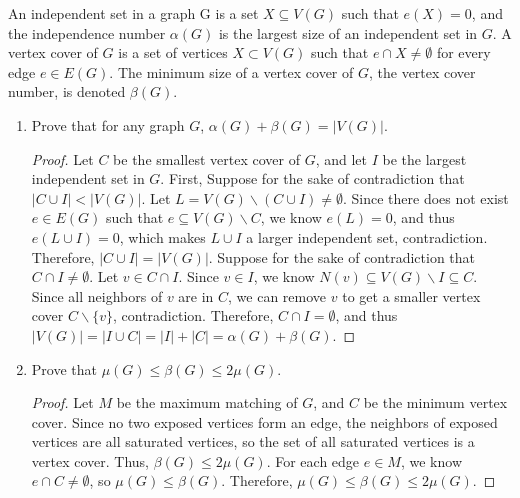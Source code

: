 \documentclass{article}
\newenvironment{problem}[2][Problem]{\begin{trivlist}
\item[\hskip \labelsep {\bfseries #1}\hskip \labelsep {\bfseries #2.}]}{\end{trivlist}}
\begin{document}
\begin{problem}{3.8.17}
    An independent set in a graph G is a set $X \subseteq V (G)$ such that $e(X) = 0$, and the independence number $\alpha(G)$ is the largest size of an independent set in $G$. A vertex cover of $G$ is a set of vertices $X \subset V(G)$ such that $e \cap X \neq \emptyset$ for every edge $e \in E(G)$. The minimum size of a vertex cover of $G$, the vertex cover number, is denoted $\beta(G)$.
\end{problem}

\begin{enumerate}[label=(\alph*)]
    \item Prove that for any graph $G$, $\alpha(G) + \beta(G) = |V(G)|$.

    \begin{proof}
        Let $C$ be the smallest vertex cover of $G$, and let $I$ be the largest independent set in $G$. First, Suppose for the sake of contradiction that $|C \cup I| < |V(G)|$. Let $L = V(G) \backslash (C \cup I) \neq \emptyset$. Since there does not exist $e \in E(G)$ such that $e \subseteq V(G) \backslash C$, we know $e(L) = 0$, and thus $e(L \cup I) = 0$, which makes $L \cup I$ a larger independent set, contradiction. Therefore, $|C \cup I| = |V(G)|$. Suppose for the sake of contradiction that $C \cap I \neq \emptyset$. Let $v \in C \cap I$. Since $v \in I$, we know $N(v) \subseteq V(G) \backslash I \subseteq C$. Since all neighbors of $v$ are in $C$, we can remove $v$ to get a smaller vertex cover $C \backslash \{v\}$, contradiction. Therefore, $C \cap I = \emptyset$, and thus $|V(G)| = |I \cup C| = |I| + |C| = \alpha(G) + \beta(G)$.
    \end{proof}

    \item  Prove that $\mu(G) \leq \beta(G) \leq 2\mu(G)$.
    
    \begin{proof}
        Let $M$ be the maximum matching of $G$, and $C$ be the minimum vertex cover. Since no two exposed vertices form an edge, the neighbors of exposed vertices are all saturated vertices, so the set of all saturated vertices is a vertex cover. Thus, $\beta(G) \leq 2\mu(G)$. For each edge $e \in M$, we know $e \cap C \neq \emptyset$, so $\mu(G) \leq \beta(G)$. Therefore, $\mu(G) \leq \beta(G) \leq 2\mu(G)$.
    \end{proof}
\end{enumerate}
\end{document}
